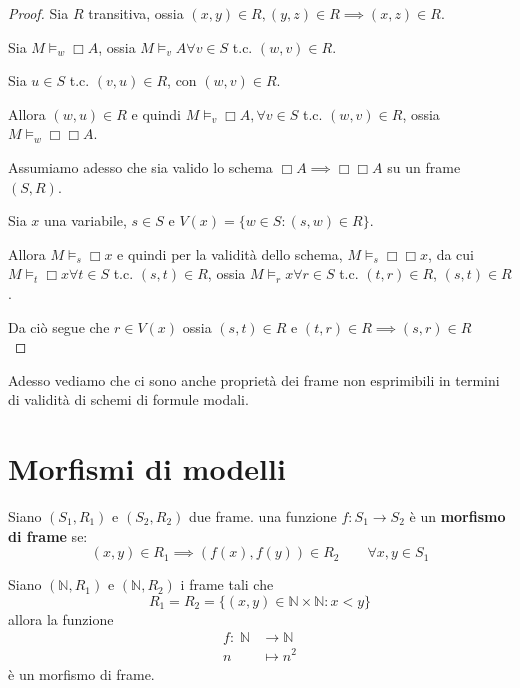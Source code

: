 \documentclass[../main.tex]{subfiles}
\begin{document}
\begin{proof}
    Sia $R$ transitiva, ossia $(x,y) \in R, (y,z) \in R \implies (x,z) \in R$.

    Sia $M \vDash_w \Box A$, ossia $M \vDash_v A \forall v \in S$ t.c. $(w,v) \in R$.

    Sia $u \in S$ t.c. $(v,u) \in R$, con $(w,v) \in R$.

    Allora $(w,u) \in R$ e quindi $M \vDash_v \Box A, \forall v \in S$ t.c. $(w,v) \in R$, ossia $M \vDash_w \Box \Box A$.

    Assumiamo adesso che sia valido lo schema $\Box A \implies \Box \Box A$ su un frame $(S,R)$.

    Sia $x$ una variabile, $s \in S$ e $V(x) = \{w \in S : (s,w) \in R\}$.

    Allora $M \vDash_s \Box x$ e quindi per la validità dello schema, $M \vDash_s \Box \Box x $, da cui $M \vDash_t \Box x \forall t \in S$ t.c. $(s,t) \in R$, ossia $M \vDash_r x \forall r \in S$ t.c. $(t,r) \in R$, $(s,t) \in R$.

    Da ciò segue che $r \in V(x)$ ossia $(s,t) \in R$ e $(t,r) \in R \implies (s,r) \in R$\\
\end{proof}
Adesso vediamo che ci sono anche proprietà dei frame non esprimibili in termini di validità di schemi di formule modali.

\section{Morfismi di modelli}
\begin{definition}
    Siano $(S_1, R_1)$ e $(S_2, R_2)$ due frame. una funzione $f : S_1 \rightarrow S_2$ è un \textbf{morfismo di frame} se:
    \begin{equation*}
        (x,y)\in R_1 \implies (f(x), f(y)) \in R_2 \qquad \forall x,y \in S_1
    \end{equation*}
\end{definition}
\begin{example}
    Siano $(\mathbb{N}, R_1)$ e $(\mathbb{N}, R_2)$ i frame tali che
    \begin{equation*}
        R_1 = R_2 = \{(x,y) \in \mathbb{N} \times \mathbb{N} : x < y\}
    \end{equation*}
    allora la funzione
    \begin{align*}
        f : \; \mathbb{N} & \rightarrow \mathbb{N} \\
        n                 & \mapsto n^2
    \end{align*}
    è un morfismo di frame.
\end{example}
\end{document}
